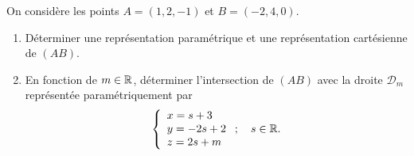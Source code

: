 \documentclass[a4paper, 11pt,reqno]{article}
\begin{document}
\begin{exercice}  \;
On consid\`ere les points $A=(1,2,-1)$ et $B=(-2,4,0)$.
\begin{enumerate}
\item D\'eterminer une repr\'esentation param\'etrique et une repr\'esentation cart\'esienne de $(AB)$.
\item En fonction de $m \in \mathbb{R}$, d\'eterminer l'intersection de $(AB)$ avec la droite $\mathcal{D}_m$ repr\'esent\'ee param\'etriquement par 
$$ \left\{ \begin{array}{l}
	x = s+3 \\
	y= -2s+2 \\
	z = 2s+m
\end{array}\right. ; \quad s\in \mathbb{R} .$$
\end{enumerate}
\end{exercice}
\end{document}
